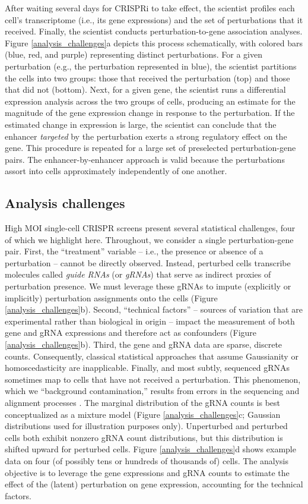 \documentclass[12pt]{article}
\begin{document}
After waiting several days for CRISPRi to take effect, the scientist profiles each cell's transcriptome (i.e., its gene expressions) and the set of perturbations that it received. Finally, the scientist conducts perturbation-to-gene association analyses. Figure \ref{analysis_challenges}a depicts this process schematically, with colored bars (blue, red, and purple) representing distinct perturbations. For a given perturbation (e.g., the perturbation represented in blue), the scientist partitions the cells into two groups: those that received the perturbation (top) and those that did not (bottom). Next, for a given gene, the scientist runs a differential expression analysis across the two groups of cells, producing an estimate for the magnitude of the gene expression change in response to the perturbation. If the estimated change in expression is large, the scientist can conclude that the enhancer \textit{targeted} by the perturbation exerts a strong regulatory effect on the gene. This procedure is repeated for a large set of preselected perturbation-gene pairs. The enhancer-by-enhancer approach is valid because the perturbations assort into cells approximately independently of one another.

\subsection{Analysis challenges}
High MOI single-cell CRISPR screens present several statistical challenges, four of which we highlight here. Throughout, we consider a single perturbation-gene pair. First, the ``treatment'' variable -- i.e., the presence or absence of a perturbation -- cannot be directly observed. Instead, perturbed cells transcribe molecules called  \textit{guide RNAs} (or \textit{gRNAs}) that serve as indirect proxies of perturbation presence. We must leverage these gRNAs to impute (explicitly or implicitly) perturbation assignments onto the cells (Figure \ref{analysis_challenges}b). Second, ``technical factors'' -- sources of variation that are experimental rather than biological in origin -- impact the measurement of both gene and gRNA expressions and therefore act as confounders (Figure \ref{analysis_challenges}b). Third, the gene and gRNA data are sparse, discrete counts. Consequently, classical statistical approaches that assume Gaussianity or homoscedasticity are inapplicable. Finally, and most subtly, sequenced gRNAs sometimes map to cells that have not received a perturbation. This phenomenon, which we ``background contamination,'' results from errors in the sequencing and alignment processes \parencite{Replogle2020}. The marginal distribution of the gRNA counts is best conceptualized as a mixture model (Figure \ref{analysis_challenges}c; Gaussian distributions used for illustration purposes only). Unperturbed and perturbed cells both exhibit nonzero gRNA count distributions, but this distribution is shifted upward for perturbed cells. Figure \ref{analysis_challenges}d shows example data on four (of possibly tens or hundreds of thousands of) cells. The analysis objective is to leverage the gene expressions and gRNA counts to estimate the effect of the (latent) perturbation on gene expression, accounting for the technical factors.
\end{document}
